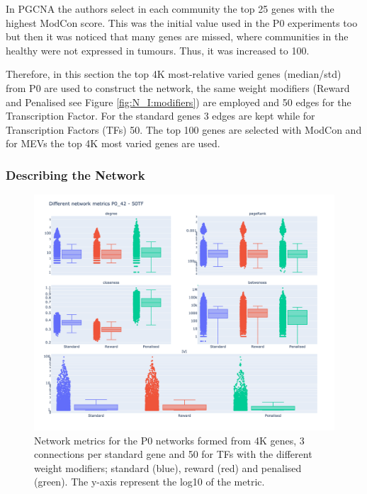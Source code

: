 In PGCNA \citet{Care2019-ij} the authors select in each community the top 25 genes with the highest ModCon score. This was the initial value used in the P0 experiments too but then it was noticed that many genes are missed, where communities in the healthy were not expressed in tumours. Thus, it was increased to 100.

Therefore, in this section the top 4K most-relative varied genes (median/std) from P0 are used to construct the network, the same weight modifiers (Reward and Penalised see Figure \ref{fig:N_I:modifiers}) are employed and 50 edges for the Transcription Factor. For the standard genes 3 edges are kept while for Transcription Factors (TFs) 50. The top 100 genes are selected with ModCon and for MEVs the top 4K most varied genes are used.

\subsubsection{Describing the Network}


\begin{figure}[!htb]    
    \centering
    \includegraphics[width=1.0\textwidth,height=0.7\textheight,keepaspectratio]{Sections/Network_I/Resources/P0/P0_NetworkMetricsComp_50TF_2.png}
    \caption{Network metrics for the P0 networks formed from 4K genes, 3 connections per standard gene and 50 for TFs with the different weight modifiers; standard (blue), reward (red) and penalised (green). The y-axis represent the log10 of the metric. }
    \label{fig:N_I:net_metrics_p0}
\end{figure}

